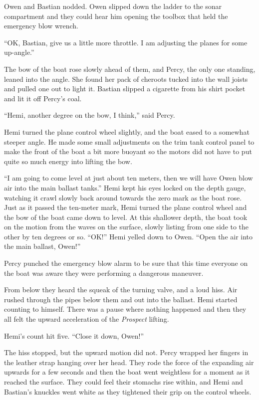 \documentclass[
]{scrbook}
\begin{document}
Owen and Bastian nodded. Owen slipped down the ladder to the sonar
compartment and they could hear him opening the toolbox that held the
emergency blow wrench.

``OK, Bastian, give us a little more throttle. I am adjusting the planes
for some up-angle.''

The bow of the boat rose slowly ahead of them, and Percy, the only one
standing, leaned into the angle. She found her pack of cheroots tucked
into the wall joists and pulled one out to light it. Bastian slipped a
cigarette from his shirt pocket and lit it off Percy's coal.

``Hemi, another degree on the bow, I think,'' said Percy.

Hemi turned the plane control wheel slightly, and the boat eased to a
somewhat steeper angle. He made some small adjustments on the trim tank
control panel to make the front of the boat a bit more buoyant so the
motors did not have to put quite so much energy into lifting the bow.

``I am going to come level at just about ten meters, then we will have
Owen blow air into the main ballast tanks.'' Hemi kept his eyes locked
on the depth gauge, watching it crawl slowly back around towards the
zero mark as the boat rose. Just as it passed the ten-meter mark, Hemi
turned the plane control wheel and the bow of the boat came down to
level. At this shallower depth, the boat took on the motion from the
waves on the surface, slowly listing from one side to the other by ten
degrees or so. ``OK!'' Hemi yelled down to Owen. ``Open the air into the
main ballast, Owen!''

Percy punched the emergency blow alarm to be sure that this time
everyone on the boat was aware they were performing a dangerous
maneuver.

From below they heard the squeak of the turning valve, and a loud hiss.
Air rushed through the pipes below them and out into the ballast. Hemi
started counting to himself. There was a pause where nothing happened
and then they all felt the upward acceleration of the \emph{Prospect}
lifting.

Hemi's count hit five. ``Close it down, Owen!''

The hiss stopped, but the upward motion did not. Percy wrapped her
fingers in the leather strap hanging over her head. They rode the force
of the expanding air upwards for a few seconds and then the boat went
weightless for a moment as it reached the surface. They could feel their
stomachs rise within, and Hemi and Bastian's knuckles went white as they
tightened their grip on the control wheels.
\end{document}
